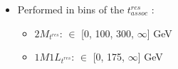 {{        \vspace{-0.1cm}
        \begin{itemize}
          \footnotesize
        \item Performed in bins of the $t^{res}_{assoc}$ \pT:
          \begin{itemize}
            \footnotesize
          \item $2M_{t^{res}}$: \pT $\in$ [0, 100, 300, $\infty$] GeV
          \item $1M1L_{t^{res}}$: \pT $\in$ [0, 175, $\infty$] GeV 
          \end{itemize}          
        \end{itemize}        
      }
      {
        \vspace{-3.5cm}
        \vspace{-.55cm}
        \begin{columns}[T]
          \begin{column}{0.05\textwidth}\end{column}
          \begin{column}{0.99\textwidth}
          \end{column}
          \end{columns}
      }
}

